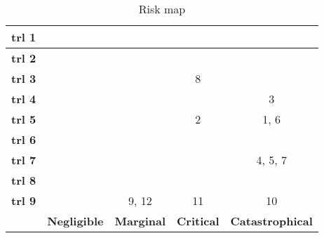 \begin{table}[H]
	\centering
	\caption{Risk map}
	\label{tab:riskmap}
	\begin{tabular}{|c|c|c|c|c|} %
		\hline
		\textbf{\gls{trl} 1} & \cellcolor{green!70} & \cellcolor{yellow!75}  & \cellcolor{red!60} & \cellcolor{red!60}  \\ \hline
		\textbf{\gls{trl} 2} & \cellcolor{green!70} & \cellcolor{yellow!75}  & \cellcolor{red!60} & \cellcolor{red!60} \\ \hline
		\textbf{\gls{trl} 3} & \cellcolor{green!70} & \cellcolor{yellow!75} & \cellcolor{yellow!75} 8 & \cellcolor{red!60}  \\ \hline
		\textbf{\gls{trl} 4} & \cellcolor{green!70} & \cellcolor{yellow!75} & \cellcolor{yellow!75} & \cellcolor{yellow!75} 3 \\ \hline
		\textbf{\gls{trl} 5} & \cellcolor{green!70} & \cellcolor{green!70} & \cellcolor{yellow!75} 2 & \cellcolor{yellow!75} 1, 6 \\ \hline
		\textbf{\gls{trl} 6} & \cellcolor{green!70} & \cellcolor{green!70} & \cellcolor{green!70} & \cellcolor{green!70}\\ \hline
		\textbf{\gls{trl} 7} & \cellcolor{green!70} & \cellcolor{green!70} & \cellcolor{green!70} & \cellcolor{green!70} 4, 5, 7 \\ \hline
		\textbf{\gls{trl} 8} & \cellcolor{green!70} & \cellcolor{green!70} & \cellcolor{green!70} & \cellcolor{green!70} \\ \hline
		\textbf{\gls{trl} 9} & \cellcolor{green!70} & \cellcolor{green!70} 9, 12 & \cellcolor{green!70} 11 & \cellcolor{green!70} 10  \\ \hline
		& \textbf{Negligible} & \textbf{Marginal} & \textbf{Critical} & \textbf{Catastrophical} \\ \hline
	\end{tabular}
\end{table}






